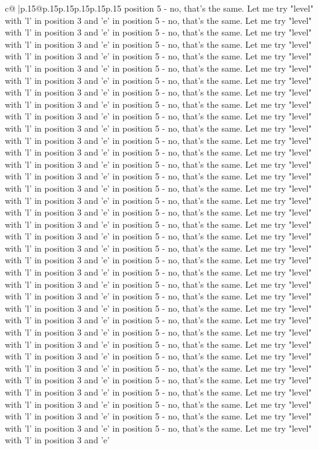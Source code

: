 \documentclass{article}
\begin{document}
{\begin{supertabular}{c@{$\;$}|p{.15\linewidth}@{}p{.15\linewidth}p{.15\linewidth}p{.15\linewidth}p{.15\linewidth}p{.15\linewidth}}
{{{position 5 {-} no, that's the same. Let me try "level" with 'l' in position 3 and 'e' in position 5 {-} no, that's the same. Let me try "level" with 'l' in position 3 and 'e' in position 5 {-} no, that's the same. Let me try "level" with 'l' in position 3 and 'e' in position 5 {-} no, that's the same. Let me try "level" with 'l' in position 3 and 'e' in position 5 {-} no, that's the same. Let me try "level" with 'l' in position 3 and 'e' in position 5 {-} no, that's the same. Let me try "level" with 'l' in position 3 and 'e' in position 5 {-} no, that's the same. Let me try "level" with 'l' in position 3 and 'e' in position 5 {-} no, that's the same. Let me try "level" with 'l' in position 3 and 'e' in position 5 {-} no, that's the same. Let me try "level" with 'l' in position 3 and 'e' in position 5 {-} no, that's the same. Let me try "level" with 'l' in position 3 and 'e' in position 5 {-} no, that's the same. Let me try "level" with 'l' in position 3 and 'e' in position 5 {-} no, that's the same. Let me try "level" with 'l' in position 3 and 'e' in position 5 {-} no, that's the same. Let me try "level" with 'l' in position 3 and 'e' in position 5 {-} no, that's the same. Let me try "level" with 'l' in position 3 and 'e' in position 5 {-} no, that's the same. Let me try "level" with 'l' in position 3 and 'e' in position 5 {-} no, that's the same. Let me try "level" with 'l' in position 3 and 'e' in position 5 {-} no, that's the same. Let me try "level" with 'l' in position 3 and 'e' in position 5 {-} no, that's the same. Let me try "level" with 'l' in position 3 and 'e' in position 5 {-} no, that's the same. Let me try "level" with 'l' in position 3 and 'e' in position 5 {-} no, that's the same. Let me try "level" with 'l' in position 3 and 'e' in position 5 {-} no, that's the same. Let me try "level" with 'l' in position 3 and 'e' in position 5 {-} no, that's the same. Let me try "level" with 'l' in position 3 and 'e' in position 5 {-} no, that's the same. Let me try "level" with 'l' in position 3 and 'e' in position 5 {-} no, that's the same. Let me try "level" with 'l' in position 3 and 'e' in position 5 {-} no, that's the same. Let me try "level" with 'l' in position 3 and 'e' in position 5 {-} no, that's the same. Let me try "level" with 'l' in position 3 and 'e' in position 5 {-} no, that's the same. Let me try "level" with 'l' in position 3 and 'e' in position 5 {-} no, that's the same. Let me try "level" with 'l' in position 3 and 'e' in position 5 {-} no, that's the same. Let me try "level" with 'l' in position 3 and 'e' in position 5 {-} no, that's the same. Let me try "level" with 'l' in position 3 and 'e' in position 5 {-} no, that's the same. Let me try "level" with 'l' in position 3 and 'e' in position 5 {-} no, that's the same. Let me try "level" with 'l' in position 3 and 'e' in position 5 {-} no, that's the same. Let me try "level" with 'l' in position 3 and 'e' in position 5 {-} no, that's the same. Let me try "level" with 'l' in position 3 and 'e' in position 5 {-} no, that's the same. Let me try "level" with 'l' in position 3 and 'e' in position 5 {-} no, that's the same. Let me try "level" with 'l' in position 3 and 'e' }}}
\end{supertabular}}
\end{document}
